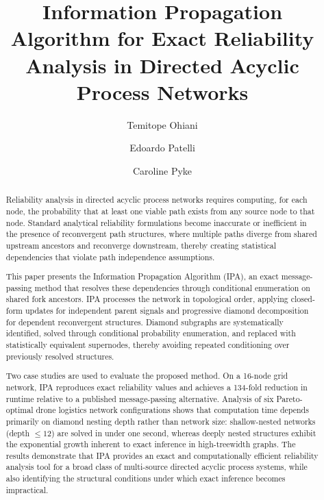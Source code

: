 \documentclass[preprint,12pt]{elsarticle}
\begin{document}
\linenumbers

\begin{frontmatter}


\title{Information Propagation Algorithm for Exact Reliability Analysis in Directed Acyclic Process Networks}

\author[strathclyde]{Temitope Ohiani}
\author[strathclyde]{Edoardo Patelli} 
\author[nnl]{Caroline Pyke}





\begin{abstract}
Reliability analysis in directed acyclic process networks requires computing, for each node, the probability that at least one viable path exists from any source node to that node. Standard analytical reliability formulations become inaccurate or inefficient in the presence of reconvergent path structures, where multiple paths diverge from shared upstream ancestors and reconverge downstream, thereby creating statistical dependencies that violate path independence assumptions.

This paper presents the Information Propagation Algorithm (IPA), an exact message-passing method that resolves these dependencies through conditional enumeration on shared fork ancestors. IPA processes the network in topological order, applying closed-form updates for independent parent signals and progressive diamond decomposition for dependent reconvergent structures. Diamond subgraphs are systematically identified, solved through conditional probability enumeration, and replaced with statistically equivalent supernodes, thereby avoiding repeated conditioning over previously resolved structures.

Two case studies are used to evaluate the proposed method. On a 16-node grid network, IPA reproduces exact reliability values and achieves a 134-fold reduction in runtime relative to a published message-passing alternative. Analysis of six Pareto-optimal drone logistics network configurations shows that computation time depends primarily on diamond nesting depth rather than network size: shallow-nested networks (depth $\leq 12$) are solved in under one second, whereas deeply nested structures exhibit the exponential growth inherent to exact inference in high-treewidth graphs. The results demonstrate that IPA provides an exact and computationally efficient reliability analysis tool for a broad class of multi-source directed acyclic process systems, while also identifying the structural conditions under which exact inference becomes impractical.
\end{abstract}


\end{frontmatter}
\end{document}
